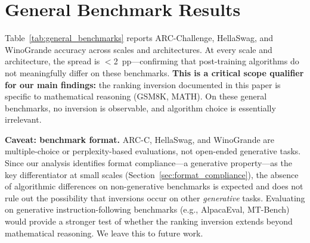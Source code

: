 \documentclass{article}
\begin{document}
\section{General Benchmark Results}
\label{app:general_benchmarks}

Table~\ref{tab:general_benchmarks} reports ARC-Challenge, HellaSwag, and WinoGrande accuracy across scales and architectures. At every scale and architecture, the spread is $<$2~pp---confirming that post-training algorithms do not meaningfully differ on these benchmarks. \textbf{This is a critical scope qualifier for our main findings:} the ranking inversion documented in this paper is specific to mathematical reasoning (GSM8K, MATH). On these general benchmarks, no inversion is observable, and algorithm choice is essentially irrelevant.

\textbf{Caveat: benchmark format.} ARC-C, HellaSwag, and WinoGrande are multiple-choice or perplexity-based evaluations, not open-ended generative tasks. Since our analysis identifies format compliance---a generative property---as the key differentiator at small scales (Section~\ref{sec:format_compliance}), the absence of algorithmic differences on non-generative benchmarks is expected and does not rule out the possibility that inversions occur on other \emph{generative} tasks. Evaluating on generative instruction-following benchmarks (e.g., AlpacaEval, MT-Bench) would provide a stronger test of whether the ranking inversion extends beyond mathematical reasoning. We leave this to future work.
\end{document}
